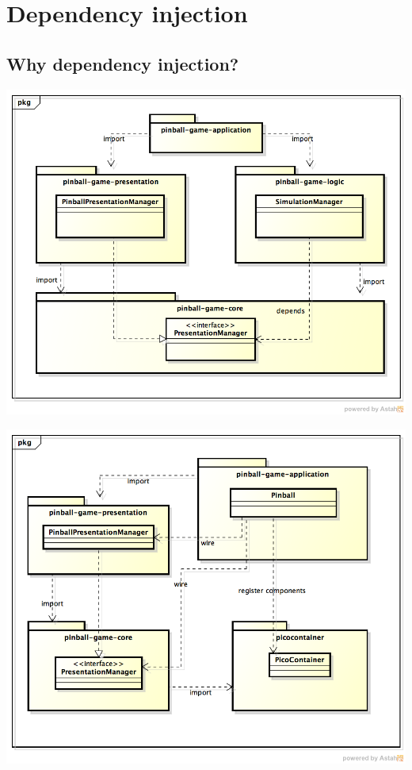 \documentclass[fontsize=12pt,
               paper=a4,
               twoside=false,
               parskip=half,
               ]{scrartcl}
\begin{document}
\section{Dependency injection}
\subsection{Why dependency injection?}
\includegraphics[width=15.5cm]{./img/dependency-injection1.png}

\includegraphics[width=15.5cm]{./img/dependency-injection2.png}
\end{document}
